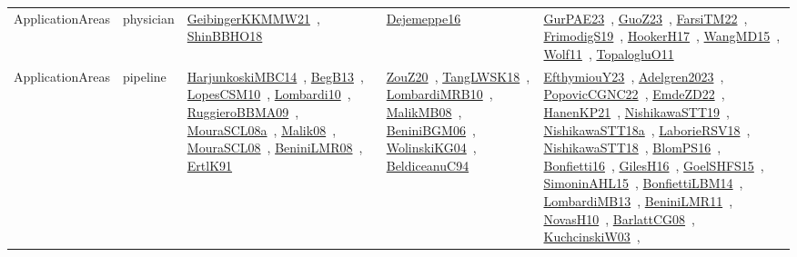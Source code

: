 {\begin{longtable}{lp{3cm}>{\raggedright\arraybackslash}p{6cm}>{\raggedright\arraybackslash}p{6cm}>{\raggedright\arraybackslash}p{8cm}}
ApplicationAreas & physician & \href{../works/GeibingerKKMMW21.pdf}{GeibingerKKMMW21}~\cite{GeibingerKKMMW21}, \href{../works/ShinBBHO18.pdf}{ShinBBHO18}~\cite{ShinBBHO18} & \href{../works/Dejemeppe16.pdf}{Dejemeppe16}~\cite{Dejemeppe16} & \href{../works/GurPAE23.pdf}{GurPAE23}~\cite{GurPAE23}, \href{../works/GuoZ23.pdf}{GuoZ23}~\cite{GuoZ23}, \href{../works/FarsiTM22.pdf}{FarsiTM22}~\cite{FarsiTM22}, \href{../works/FrimodigS19.pdf}{FrimodigS19}~\cite{FrimodigS19}, \href{../works/HookerH17.pdf}{HookerH17}~\cite{HookerH17}, \href{../works/WangMD15.pdf}{WangMD15}~\cite{WangMD15}, \href{../works/Wolf11.pdf}{Wolf11}~\cite{Wolf11}, \href{../works/TopalogluO11.pdf}{TopalogluO11}~\cite{TopalogluO11}\\
ApplicationAreas & pipeline & \href{../works/HarjunkoskiMBC14.pdf}{HarjunkoskiMBC14}~\cite{HarjunkoskiMBC14}, \href{../works/BegB13.pdf}{BegB13}~\cite{BegB13}, \href{../works/LopesCSM10.pdf}{LopesCSM10}~\cite{LopesCSM10}, \href{../works/Lombardi10.pdf}{Lombardi10}~\cite{Lombardi10}, \href{../works/RuggieroBBMA09.pdf}{RuggieroBBMA09}~\cite{RuggieroBBMA09}, \href{../works/MouraSCL08a.pdf}{MouraSCL08a}~\cite{MouraSCL08a}, \href{../works/Malik08.pdf}{Malik08}~\cite{Malik08}, \href{../works/MouraSCL08.pdf}{MouraSCL08}~\cite{MouraSCL08}, \href{../works/BeniniLMR08.pdf}{BeniniLMR08}~\cite{BeniniLMR08}, \href{../works/ErtlK91.pdf}{ErtlK91}~\cite{ErtlK91} & \href{../works/ZouZ20.pdf}{ZouZ20}~\cite{ZouZ20}, \href{../works/TangLWSK18.pdf}{TangLWSK18}~\cite{TangLWSK18}, \href{../works/LombardiMRB10.pdf}{LombardiMRB10}~\cite{LombardiMRB10}, \href{../works/MalikMB08.pdf}{MalikMB08}~\cite{MalikMB08}, \href{../works/BeniniBGM06.pdf}{BeniniBGM06}~\cite{BeniniBGM06}, \href{../works/WolinskiKG04.pdf}{WolinskiKG04}~\cite{WolinskiKG04}, \href{../works/BeldiceanuC94.pdf}{BeldiceanuC94}~\cite{BeldiceanuC94} & \href{../works/EfthymiouY23.pdf}{EfthymiouY23}~\cite{EfthymiouY23}, \href{../works/Adelgren2023.pdf}{Adelgren2023}~\cite{Adelgren2023}, \href{../works/PopovicCGNC22.pdf}{PopovicCGNC22}~\cite{PopovicCGNC22}, \href{../works/EmdeZD22.pdf}{EmdeZD22}~\cite{EmdeZD22}, \href{../works/HanenKP21.pdf}{HanenKP21}~\cite{HanenKP21}, \href{../works/NishikawaSTT19.pdf}{NishikawaSTT19}~\cite{NishikawaSTT19}, \href{../works/NishikawaSTT18a.pdf}{NishikawaSTT18a}~\cite{NishikawaSTT18a}, \href{../works/LaborieRSV18.pdf}{LaborieRSV18}~\cite{LaborieRSV18}, \href{../works/NishikawaSTT18.pdf}{NishikawaSTT18}~\cite{NishikawaSTT18}, \href{../works/BlomPS16.pdf}{BlomPS16}~\cite{BlomPS16}, \href{../works/Bonfietti16.pdf}{Bonfietti16}~\cite{Bonfietti16}, \href{../works/GilesH16.pdf}{GilesH16}~\cite{GilesH16}, \href{../works/GoelSHFS15.pdf}{GoelSHFS15}~\cite{GoelSHFS15}, \href{../works/SimoninAHL15.pdf}{SimoninAHL15}~\cite{SimoninAHL15}, \href{../works/BonfiettiLBM14.pdf}{BonfiettiLBM14}~\cite{BonfiettiLBM14}, \href{../works/LombardiMB13.pdf}{LombardiMB13}~\cite{LombardiMB13}, \href{../works/BeniniLMR11.pdf}{BeniniLMR11}~\cite{BeniniLMR11}, \href{../works/NovasH10.pdf}{NovasH10}~\cite{NovasH10}, \href{../works/BarlattCG08.pdf}{BarlattCG08}~\cite{BarlattCG08}, \href{../works/KuchcinskiW03.pdf}{KuchcinskiW03}~\cite{KuchcinskiW03}, 
\end{longtable}}
